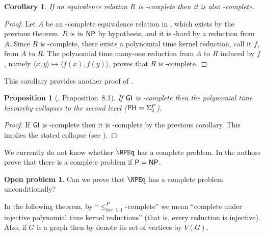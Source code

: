\documentclass[draft]{article}
\newtheorem{proposition}[proposition]{Proposition}
\newtheorem{corollary}[corollary]{Corollary}
\theoremstyle{definition} \newtheorem{openproblem}[openproblem]{Open problem}
\theoremstyle{definition} \newtheorem{definition}[definition]{Definition}
\theoremstyle{remark} \newtheorem{remark}{Remark}
\newcommand{\kri}{\leq^{P}_{ker,1\text{--}1}} %
\newcommand{\pair}[2]{\langle#1,#2\rangle} %
\begin{document}
\begin{corollary}
  If an equivalence relation $R$ is \NPEq-complete then it is also \NP-complete.
\end{corollary}
\begin{proof}
  Let $A$ be an \NP-complete equivalence relation in \NPEq, which exists by the previous theorem.
  $R$ is in ${\mathsf{NP}}$ by hypothesis, and it is \NP-hard by a reduction from $A$.
  Since $R$ is \NPEq-complete, there exists a polynomial time kernel reduction, call it $f$, from $A$ to $R$.
  The polynomial time many-one reduction from $A$ to $R$ induced by $f$, namely $\pair{x}{y}\mapsto\pair{f(x)}{f(y)}$, proves that $R$ is \NP-complete.
\end{proof}

This corollary provides another proof of \cite[Proposition~8.1]{bcffm}.

\begin{proposition}[\cite{bcffm}, Proposition~8.1]
  If ${\mathsf{GI}}$ is \NPEq-complete then the polynomial time hierarchy collapses to the second level (${\mathsf{PH}}=\Sigma^P_2$).
\end{proposition}
\begin{proof}
  If ${\mathsf{GI}}$ is \NPEq-complete then it is \NP-complete by the previous corollary.
  This implies the stated collapse (see \cite{schoning87}).
\end{proof}

We currently do not know whether $\NPEq$ has a complete problem.
In \cite{bcffm} the authors prove that there is a complete problem if ${\mathsf{P}}={\mathsf{NP}}$.
\begin{openproblem}
  Can we prove that $\NPEq$ has a complete problem unconditionally?
\end{openproblem}

In the following theorem, by ``$\kri$-complete'' we mean ``complete under injective polynomial time kernel reductions'' (that is, every reduction is injective).
Also, if $G$ is a graph then by denote its set of vertices by $V(G)$.
\end{document}
